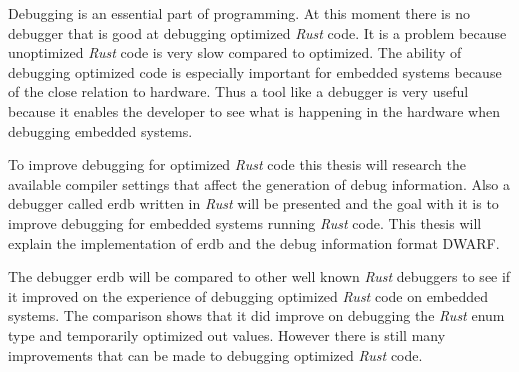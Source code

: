 Debugging is an essential part of programming.
At this moment there is no debugger that is good at debugging optimized \emph{Rust} code.
It is a problem because unoptimized \emph{Rust} code is very slow compared to optimized.
The ability of debugging optimized code is especially important for embedded systems because of the close relation to hardware.
Thus a tool like a debugger is very useful because it enables the developer to see what is happening in the hardware when debugging embedded systems.


To improve debugging for optimized \emph{Rust} code this thesis will research the available compiler settings that affect the generation of debug information.
Also a debugger called \acrshort{erdb} written in \emph{Rust} will be presented and the goal with it is to improve debugging for embedded systems running \emph{Rust} code.
This thesis will explain the implementation of \acrshort{erdb} and the debug information format \acrshort{DWARF}.


The debugger \acrshort{erdb} will be compared to other well known \emph{Rust} debuggers to see if it improved on the experience of debugging optimized \emph{Rust} code on embedded systems.
The comparison shows that it did improve on debugging the \emph{Rust} enum type and temporarily optimized out values.
However there is still many improvements that can be made to debugging optimized \emph{Rust} code.

